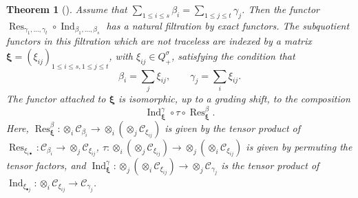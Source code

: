 \documentclass[12pt]{amsart}
\renewcommand\b{\beta}
\newcommand\g{\gamma}
\newcommand\s{\sigma}
\renewcommand{\1}{\mathbb 1}
\newcommand\Bxi{\boldsymbol\xi}
\newcommand\SC{\mathscr{C}}
\newcommand\Ind{\operatorname{Ind}}
\newcommand\Res{\operatorname{Res}}
\numberwithin{equation}{section}
\newtheorem{thm}{Theorem}[section]
\begin{document}
\begin{thm} [{\cite[ Thm. 4.5]{M}}]  %
Assume that $\sum_{1 \le i \le s} \b_i = \sum_{1 \le j \le t}\g_j$.  
Then the functor $\Res_{\g_1,\dots, \g_t}\circ \Ind_{\b_1, \dots, \b_s}$ has a natural filtration
by exact functors.   
The subquotient functors in this filtration which are not traceless
are indexed by a matrix $\Bxi = (\xi_{ij})_{1 \le i \le s, 1 \le j \le t}$, with
$\xi_{ij} \in Q_+^{\s}$, satisfying the condition that
\begin{equation*}
\tag{5.15.1}  
\b_i = \sum_j\xi_{ij},   \qquad \g_j = \sum_i\xi_{ij}. 
\end{equation*}
The functor attached to $\Bxi$ is isomorphic, up to a grading shift, to the composition
\begin{equation*}
\tag{5.15.2}
\Ind_{\Bxi}^{\g} \circ \tau \circ \Res_{\Bxi}^{\b}.
\end{equation*}
Here, $\Res^{\b}_{\Bxi} : \otimes_i \SC_{\b_i} \to \otimes_i(\otimes_j\SC_{\xi_{ij}})$
is given by the tensor product of
$\Res_{\xi_{i\bullet}} : \SC_{\b_i} \to \otimes_j\SC_{\xi_{ij}}$,
$\tau : \otimes_i(\otimes_j\SC_{\xi_{ij}}) \to \otimes_j(\otimes_i\SC_{\xi_{ij}})$ is
given by permuting the tensor factors,
and $\Ind_{\Bxi}^{\g} : \otimes_j(\otimes_i\SC_{\xi_{ij}}) \to \otimes_j\SC_{\g_j}$
is the tensor product of $\Ind_{\xi_{\bullet j}} : \otimes_i\SC_{\xi_{ij}} \to \SC_{\g_j}$.
\end{thm}
\end{document}
